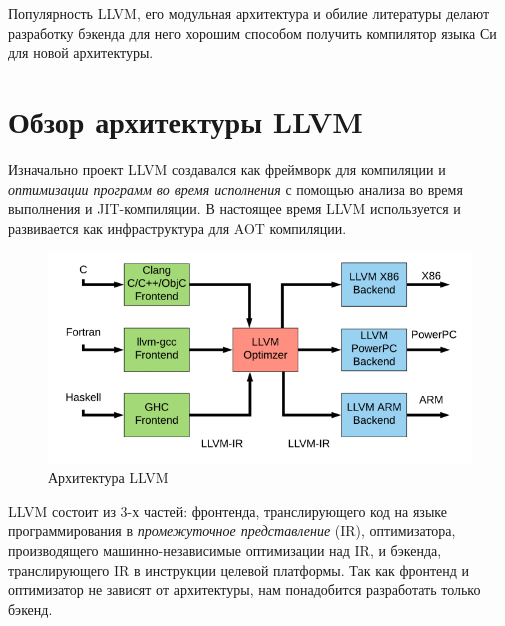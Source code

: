 \documentclass[a4paper,14pt]{extarticle}
\begin{document}
Популярность  LLVM, его модульная архитектура и обилие литературы делают разработку бэкенда для него хорошим способом получить компилятор языка Си для новой архитектуры.

\pagebreak
\section{Обзор архитектуры LLVM}

Изначально проект LLVM создавался как фреймворк для компиляции и \emph{оптимизации программ во время исполнения} с помощью анализа во время выполнения и JIT-компиляции\cite{LLVM:CGO04}. В настоящее время LLVM используется и развивается как инфраструктура для AOT компиляции.
\begin{figure}[!h]
	\begin{center}
		\includegraphics[width=\textwidth]{LLVM-Compiler-Development-architecture.png}
		\caption{Архитектура LLVM \cite{llvmpic}}
	\end{center}
\end{figure}

LLVM состоит из 3-х частей: фронтенда, транслирующего код на языке программирования в \emph{промежуточное представление} (IR)\cite{llvm:langref}, оптимизатора, производящего машинно-независимые оптимизации над IR, и бэкенда, транслирующего IR в инструкции целевой платформы. Так как фронтенд и оптимизатор не зависят от архитектуры, нам %
понадобится разработать только бэкенд.
\end{document}
